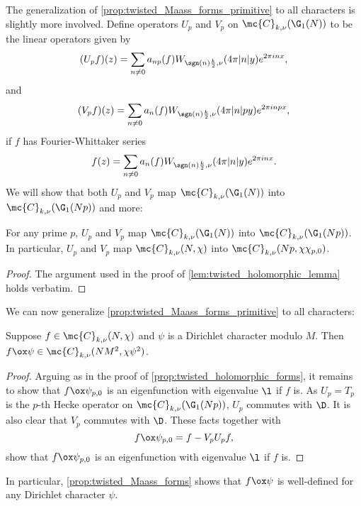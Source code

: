     The generalization of \cref{prop:twisted_Maass_forms_primitive} to all characters is slightly more involved. Define operators $U_{p}$ and $V_{p}$ on $\mc{C}_{k,\nu}(\G_{1}(N))$ to be the linear operators given by
    \[
      (U_{p}f)(z) = \sum_{n \neq 0}a_{np}(f)W_{\sgn(n)\frac{k}{2},\nu}(4\pi|n|y)e^{2\pi inx},
    \]
    and
    \[
      (V_{p}f)(z) = \sum_{n \neq 0}a_{n}(f)W_{\sgn(n)\frac{k}{2},\nu}(4\pi|n|py)e^{2\pi inpx},
    \]
    if $f$ has Fourier-Whittaker series
    \[
      f(z) = \sum_{n \neq 0}a_{n}(f)W_{\sgn(n)\frac{k}{2},\nu}(4\pi|n|y)e^{2\pi inx}.
    \]
    We will show that both $U_{p}$ and $V_{p}$ map $\mc{C}_{k,\nu}(\G_{1}(N))$ into $\mc{C}_{k,\nu}(\G_{1}(Np))$ and more:

    \begin{lemma}\label{lem:twisted_Maass_lemma}
      For any prime $p$, $U_{p}$ and $V_{p}$ map $\mc{C}_{k,\nu}(\G_{1}(N))$ into $\mc{C}_{k,\nu}(\G_{1}(Np))$. In particular, $U_{p}$ and $V_{p}$ map $\mc{C}_{k,\nu}(N,\chi)$ into $\mc{C}_{k,\nu}(Np,\chi\chi_{p,0})$.
    \end{lemma}
    \begin{proof}
      The argument used in the proof of \cref{lem:twisted_holomorphic_lemma} holds verbatim.
    \end{proof}

    We can now generalize \cref{prop:twisted_Maass_forms_primitive} to all characters:

    \begin{proposition}\label{prop:twisted_Maass_forms}
      Suppose $f \in \mc{C}_{k,\nu}(N,\chi)$ and $\psi$ is a Dirichlet character modulo $M$. Then $f \ox \psi \in \mc{C}_{k,\nu}(NM^{2},\chi\psi^{2})$.
    \end{proposition}
    \begin{proof}
      Arguing as in the proof of \cref{prop:twisted_holomorphic_forms}, it remains to show that $f \ox \psi_{p,0}$ is an eigenfunction with eigenvalue $\l$ if $f$ is. As $U_{p} = T_{p}$ is the $p$-th Hecke operator on $\mc{C}_{k,\nu}(\G_{1}(Np))$, $U_{p}$ commutes with $\D$. It is also clear that $V_{p}$ commutes with $\D$. These facts together with
      \[
        f \ox \psi_{p,0} = f-V_{p}U_{p}f,
      \]
      show that $f \ox \psi_{p,0}$ is an eigenfunction with eigenvalue $\l$ if $f$ is.
    \end{proof}

    In particular, \cref{prop:twisted_Maass_forms} shows that $f \ox \psi$ is well-defined for any Dirichlet character $\psi$.
